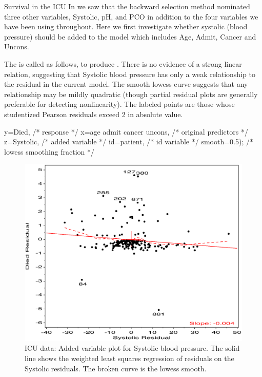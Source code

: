 \begin{Example}[icu3]{Survival in the ICU}
In  we saw that the backward selection method nominated
three other variables, Systolic, pH, and PCO in addition to the four
variables we have been using throughout.
Here we first investigate whether systolic (blood pressure) should be
added to the model which includes Age, Admit, Cancer and Uncons.

The  is called as follows, to produce .
There is no evidence of a strong linear relation, suggesting that
Systolic blood pressure has only a weak relationship to the residual in the current model.  The smooth lowess curve suggests
that any relationship may
be mildly quadratic
(though partial residual plots are generally preferable for detecting
nonlinearity).
The labeled points are those whose studentized Pearson residuals
exceed 2 in absolute value.
\begin{listing}
   y=Died,                       /* response */
   x=age admit cancer uncons,    /* original predictors */
   z=Systolic,                   /* added variable */
   id=patient,                   /* id variable */
   smooth=0.5);                  /* lowess smoothing fraction */
\end{listing}

\begin{figure}[htb]
  \centering
  \includegraphics[scale=.6]{ch6/fig/icu61}
  \caption[ICU data: Added variable plot for Systolic blood pressure]{ICU data: Added variable plot for Systolic blood pressure.
 The solid line shows the weighted least squares regression of residuals
 on the Systolic residuals.  The broken curve is the lowess smooth.}%
  \label{fig:icu61}
\end{figure}


\end{Example}
